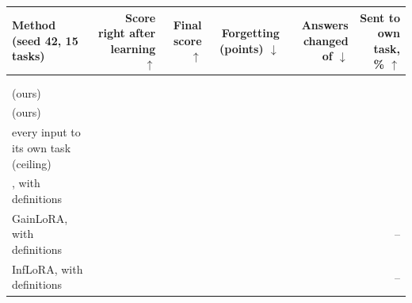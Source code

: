 {\footnotesize\setlength{\tabcolsep}{3pt}\begin{tabular}{p{1.75in}rrrrr}
    \toprule
    Method (seed 42, 15 tasks) & \shortstack[r]{Score right\\after\\learning $\uparrow$} & \shortstack[r]{Final\\score $\uparrow$} & \shortstack[r]{Forgetting\\(points) $\downarrow$} & \shortstack[r]{Answers\\changed\\of \AudFifteenNoDefCompared{} $\downarrow$} & \shortstack[r]{Sent to own\\task, \% $\uparrow$} \\
    \midrule
    \plain{} & \AudFifteenNoDefPlainLearned{} & \AudFifteenNoDefPlainAP{} & \AudFifteenNoDefPlainFT{} & \AudFifteenNoDefPlainChanged{} & \AudFifteenNoDefPlainRight{} \\
    \centre{} & \AudFifteenNoDefCentreLearned{} & \AudFifteenNoDefCentreAP{} & \AudFifteenNoDefCentreFT{} & \AudFifteenNoDefCentreChanged{} & \AudFifteenNoDefCentreRight{} \\
    \recog{} (ours) & \AudFifteenNoDefRidgeLearned{} & \AudFifteenNoDefRidgeAP{} & \AudFifteenNoDefRidgeFT{} & \AudFifteenNoDefRidgeChanged{} & \AudFifteenNoDefRidgeRight{} \\
    \handicap{} (ours) & \AudFifteenNoDefHandicapLearned{} & \AudFifteenNoDefHandicapAP{} & \AudFifteenNoDefHandicapFT{} & \AudFifteenNoDefHandicapChanged{} & \AudFifteenNoDefHandicapRight{} \\
    every input to its own task (ceiling) & \AudFifteenNoDefOwnLearned{} & \AudFifteenNoDefOwnAP{} & \AudFifteenNoDefOwnFT{} & \AudFifteenNoDefOwnChanged{} & \AudFifteenNoDefOwnRight{} \\
    \midrule
    \cert{}, with definitions & \AudFifteenDefCertLearned{} & \AudFifteenDefCertAP{} & \AudFifteenDefCertFT{} & \AudFifteenDefCertChanged{} & \AudFifteenDefCertRight{} \\
    GainLoRA, with definitions & \AudFifteenDefGainloraLearned{} & \AudFifteenDefGainloraAP{} & \AudFifteenDefGainloraFT{} & \AudFifteenDefGainloraChanged{} & -- \\
    InfLoRA, with definitions & \AudFifteenDefInfloraLearned{} & \AudFifteenDefInfloraAP{} & \AudFifteenDefInfloraFT{} & \AudFifteenDefInfloraChanged{} & -- \\
    \bottomrule
\end{tabular}}
